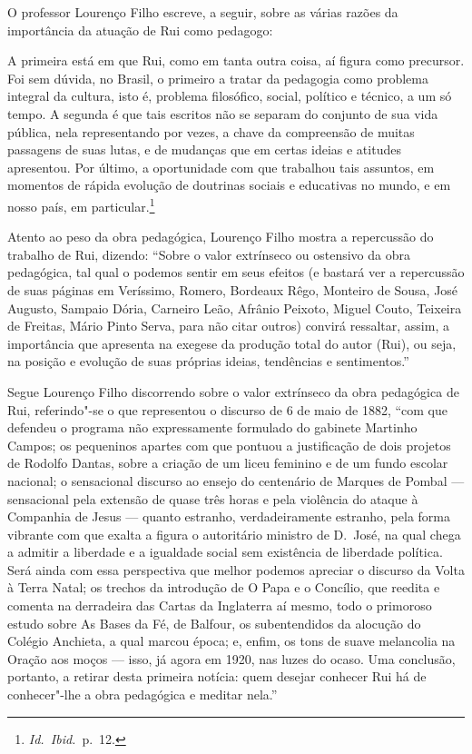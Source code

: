 O professor Lourenço Filho escreve, a seguir, sobre as várias razões da
importância da atuação de Rui como pedagogo: 

\begin{hedraquote}
A primeira está em que
Rui, como em tanta outra coisa, aí figura como precursor. Foi sem
dúvida, no Brasil, o primeiro a tratar da pedagogia como problema
integral da cultura, isto é, problema filosófico, social, político e
técnico, a um só tempo. A segunda é que tais escritos não se separam do
conjunto de sua vida pública, nela representando por vezes, a chave da
compreensão de muitas passagens de suas lutas, e de mudanças que em
certas ideias e atitudes apresentou. Por último, a oportunidade com que
trabalhou tais assuntos, em momentos de rápida evolução de doutrinas
sociais e educativas no mundo, e em nosso país, 
em particular.\footnote{\textit{Id.~Ibid.}~p.~12.} 
\end{hedraquote}

Atento ao peso da obra pedagógica, Lourenço Filho mostra a repercussão
do trabalho de Rui, dizendo: “Sobre o valor extrínseco ou ostensivo da
obra pedagógica, tal qual o podemos sentir em seus efeitos (e bastará
ver a repercussão de suas páginas em Veríssimo, Romero, Bordeaux Rêgo,
Monteiro de Sousa, José Augusto, Sampaio Dória, Carneiro Leão, Afrânio
Peixoto, Miguel Couto, Teixeira de Freitas, Mário Pinto Serva, para não
citar outros) convirá ressaltar, assim, a importância que apresenta na
exegese da produção total do autor (Rui), ou seja, na posição e
evolução de suas próprias ideias, tendências e sentimentos.”

Segue Lourenço Filho discorrendo sobre o valor extrínseco da obra
pedagógica de Rui, referindo"-se o que representou o discurso de 6 de
maio de 1882, ``com que defendeu o programa não expressamente formulado
do gabinete Martinho Campos; os pequeninos apartes com que pontuou a
justificação de dois projetos de Rodolfo Dantas, sobre a criação de um
liceu feminino e de um fundo escolar nacional; o sensacional discurso
ao ensejo do centenário de Marques de Pombal --- sensacional pela
extensão de quase três horas e pela violência do ataque à Companhia de
Jesus --- quanto estranho, verdadeiramente estranho, pela forma vibrante
com que exalta a figura o autoritário ministro de D.~José, na qual
chega a admitir a liberdade e a igualdade social sem existência de
liberdade política. Será ainda com essa perspectiva que melhor podemos
apreciar o discurso da Volta à Terra Natal; os trechos da introdução de
O Papa e o Concílio, que reedita e comenta na derradeira das Cartas da
Inglaterra aí mesmo, todo o primoroso estudo sobre As Bases da Fé, de
Balfour, os subentendidos da alocução do Colégio Anchieta, a qual
marcou época; e, enfim, os tons de suave melancolia na Oração aos moços
--- isso, já agora em 1920, nas luzes do ocaso. Uma conclusão, portanto,
a retirar desta primeira notícia: quem desejar conhecer Rui há de
conhecer"-lhe a obra pedagógica e meditar nela.''

